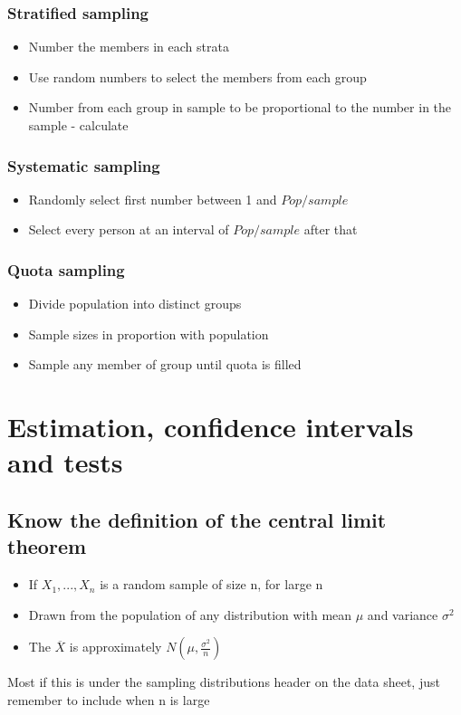 \documentclass{article}[18pt]
\begin{document}
\subsubsection{Stratified sampling}
\begin{itemize}
\item Number the members in each strata
\item Use random numbers to select the members from each group
\item Number from each group in sample to be proportional to the number in the sample - calculate
\end{itemize}
\subsubsection{Systematic sampling}
\begin{itemize}
\item Randomly select first number between 1 and $Pop/sample$
\item Select every person at an interval of $Pop/sample$ after that
\end{itemize}
\subsubsection{Quota sampling}
\begin{itemize}
\item Divide population into distinct groups
\item Sample sizes in proportion with population
\item Sample any member of group until quota is filled
\end{itemize}
\section{Estimation, confidence intervals and tests}
\subsection{Know the definition of the central limit theorem}
\begin{itemize}
\item If $X_1,...,X_n$ is a random sample of size n, for large n
\item Drawn from the population of any distribution with mean $\mu$ and variance $\sigma^2$
\item The $\overline{X}$ is approximately $N(\mu,\frac{\sigma^2}{n})$
\end{itemize}
Most if this is under the sampling distributions header on the data sheet, just remember to include when n is large
\end{document}
